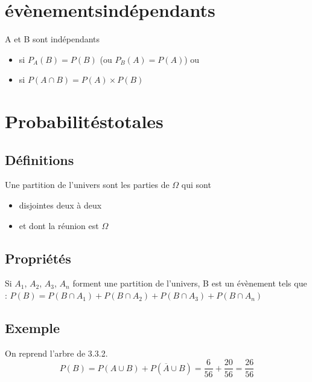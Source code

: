 \documentclass[a4paper,twoside,10pt,french,twocolumn]{scrartcl}
\begin{document}
\section{évènements\:indépendants}
A et B sont indépendants
\begin{itemize}
\item si $P_A(B) = P(B)$ (ou $P_B(A) = P(A)$) ou
\item si $P(A \cap B) = P(A) \times P(B)$
\end{itemize}
\section{Probabilités\:totales}
\subsection{Définitions}
Une partition de l'univers sont les parties de $\Omega$ qui sont
\begin{itemize}
\item disjointes deux à deux
\item et dont la réunion est $\Omega$
\end{itemize}

\subsection{Propriétés}
Si $A_1$, $A_2$, $A_3$, $A_n$ forment une partition de l'univers, B est un évènement tels que : $P(B) = P(B \cap A_1) + P(B \cap A_2) + P(B \cap A_3) + P(B \cap A_n)$
\subsection{Exemple}
On reprend l'arbre de 3.3.2.
\[ P(B) = P(A \cup B) + P(\overline{A} \cup B) = \frac{6}{56} + \frac{20}{56} = \frac{26}{56} \]
\end{document}
